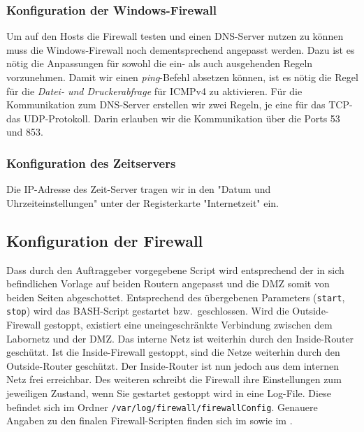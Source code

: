 \subsubsection{Konfiguration der Windows-Firewall}
\label{subsubsec:KonfigurationWinFirewall}
Um auf den Hosts die Firewall testen und einen \ac{DNS}-Server nutzen zu können muss die Windows-Firewall noch dementsprechend angepasst werden.
Dazu ist es nötig die Anpassungen für sowohl die ein- als auch ausgehenden Regeln vorzunehmen. 
Damit wir einen \textit{ping}-Befehl absetzen können, ist es nötig die Regel für die \textit{Datei- und Druckerabfrage} für \ac{ICMP}v4 zu aktivieren.
Für die Kommunikation zum \ac{DNS}-Server erstellen wir zwei Regeln, je eine für das \ac{TCP}- \bzw das \ac{UDP}-Protokoll. Darin erlauben wir die Kommunikation über die Ports 53 und 853.

\subsubsection{Konfiguration des Zeitservers}
\label{subsubsec:KonfigurationWinNTP}
Die \ac{IP}-Adresse des Zeit-Server tragen wir in den "Datum und Uhrzeiteinstellungen" unter der Registerkarte "Internetzeit" ein.

\subsection{Konfiguration der Firewall}
\label{subsec:KonfigurationFirewall}
Dass durch den Auftraggeber vorgegebene Script wird entsprechend der in sich befindlichen Vorlage auf beiden Routern angepasst und die \ac{DMZ} somit von beiden Seiten abgeschottet. Entsprechend des übergebenen Parameters (\verb+start+, \verb+stop+) wird das \ac{BASH}-Script gestartet bzw.\ geschlossen.
Wird die Outside-Firewall gestoppt, existiert eine uneingeschränkte Verbindung zwischen dem Labornetz und der \ac{DMZ}. Das interne Netz ist weiterhin durch den Inside-Router geschützt. Ist die Inside-Firewall gestoppt, sind die Netze weiterhin durch den Outside-Router geschützt. Der Inside-Router ist nun jedoch aus dem internen Netz frei erreichbar.
Des weiteren schreibt die Firewall ihre Einstellungen zum jeweiligen Zustand, wenn Sie gestartet \bzw gestoppt wird in eine Log-File. Diese befindet sich im Ordner \verb+/var/log/firewall/firewallConfig+.
Genauere Angaben zu den finalen Firewall-Scripten finden sich im  sowie im .


